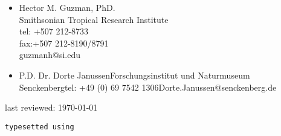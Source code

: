\documentclass[letter,10pt]{article}
\begin{document}
\begin{small}
\begin{itemize}
		\item{Hector M. Guzman, PhD.\\Smithsonian Tropical Research Institute\\tel: +507 212-8733\\fax:+507 212-8190/8791\\guzmanh@si.edu}

		\item{P.D. Dr. Dorte Janussen\newline Forschungsinstitut und Naturmuseum Senckenberg\newline tel: +49 (0) 69 7542 1306\newline Dorte.Janussen@senckenberg.de}
	\end{itemize}

	\begin{flushright}
		last reviewed: \today
	\end{flushright}
\end{small}

\begin{center}
	{\scriptsize \texttt{typesetted using}}\\{\small \texttt{\LaTeXe}}\pagebreak
\end{center}
\end{document}

